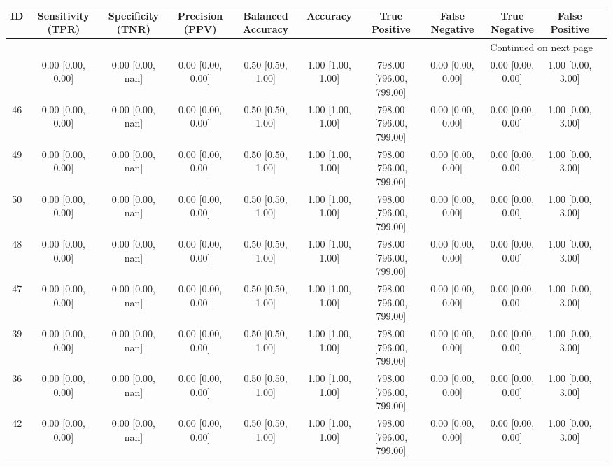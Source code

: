 \documentclass[8pt]{article}
\begin{document}
\begin{center}
\begin{footnotesize}
\begin{longtable}{|ccccccccccc|}
\toprule
 ID &  Sensitivity (TPR) & Specificity (TNR) &    Precision (PPV) &  Balanced Accuracy &           Accuracy &            True Positive &        False Negative &      True Negative &     False Positive \\
\midrule
\endhead
\midrule
\multicolumn{10}{r}{{Continued on next page}} \\
\midrule
\endfoot

\bottomrule
\endlastfoot
 45 &  0.00 [0.00, 0.00] &  0.00 [0.00, nan] &  0.00 [0.00, 0.00] &  0.50 [0.50, 1.00] &  1.00 [1.00, 1.00] &  798.00 [796.00, 799.00] &     0.00 [0.00, 0.00] &  0.00 [0.00, 0.00] &  1.00 [0.00, 3.00] \\
 46 &  0.00 [0.00, 0.00] &  0.00 [0.00, nan] &  0.00 [0.00, 0.00] &  0.50 [0.50, 1.00] &  1.00 [1.00, 1.00] &  798.00 [796.00, 799.00] &     0.00 [0.00, 0.00] &  0.00 [0.00, 0.00] &  1.00 [0.00, 3.00] \\
 49 &  0.00 [0.00, 0.00] &  0.00 [0.00, nan] &  0.00 [0.00, 0.00] &  0.50 [0.50, 1.00] &  1.00 [1.00, 1.00] &  798.00 [796.00, 799.00] &     0.00 [0.00, 0.00] &  0.00 [0.00, 0.00] &  1.00 [0.00, 3.00] \\
 50 &  0.00 [0.00, 0.00] &  0.00 [0.00, nan] &  0.00 [0.00, 0.00] &  0.50 [0.50, 1.00] &  1.00 [1.00, 1.00] &  798.00 [796.00, 799.00] &     0.00 [0.00, 0.00] &  0.00 [0.00, 0.00] &  1.00 [0.00, 3.00] \\
 48 &  0.00 [0.00, 0.00] &  0.00 [0.00, nan] &  0.00 [0.00, 0.00] &  0.50 [0.50, 1.00] &  1.00 [1.00, 1.00] &  798.00 [796.00, 799.00] &     0.00 [0.00, 0.00] &  0.00 [0.00, 0.00] &  1.00 [0.00, 3.00] \\
 47 &  0.00 [0.00, 0.00] &  0.00 [0.00, nan] &  0.00 [0.00, 0.00] &  0.50 [0.50, 1.00] &  1.00 [1.00, 1.00] &  798.00 [796.00, 799.00] &     0.00 [0.00, 0.00] &  0.00 [0.00, 0.00] &  1.00 [0.00, 3.00] \\
 39 &  0.00 [0.00, 0.00] &  0.00 [0.00, nan] &  0.00 [0.00, 0.00] &  0.50 [0.50, 1.00] &  1.00 [1.00, 1.00] &  798.00 [796.00, 799.00] &     0.00 [0.00, 0.00] &  0.00 [0.00, 0.00] &  1.00 [0.00, 3.00] \\
 36 &  0.00 [0.00, 0.00] &  0.00 [0.00, nan] &  0.00 [0.00, 0.00] &  0.50 [0.50, 1.00] &  1.00 [1.00, 1.00] &  798.00 [796.00, 799.00] &     0.00 [0.00, 0.00] &  0.00 [0.00, 0.00] &  1.00 [0.00, 3.00] \\
 42 &  0.00 [0.00, 0.00] &  0.00 [0.00, nan] &  0.00 [0.00, 0.00] &  0.50 [0.50, 1.00] &  1.00 [1.00, 1.00] &  798.00 [796.00, 799.00] &     0.00 [0.00, 0.00] &  0.00 [0.00, 0.00] &  1.00 [0.00, 3.00] \\

\end{longtable}
\end{footnotesize}
\end{center}
\end{document}
